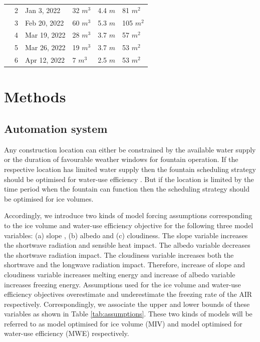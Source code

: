 \documentclass[tc, manuscript]{copernicus}
\begin{document}
\begin{table}
\begin{tabular}{@{}|llllll|@{}}
		\multicolumn{1}{|l|}{} & 2            & Jan 3, 2022   & 32 $m^{3}$      & 4.4 $m$
		                       & 81 $m^{2}$                                                                       \\
		\multicolumn{1}{|l|}{} & 3            & Feb 20, 2022   & 60 $m^{3}$      & 5.3 $m$
		                       & 105 $m^{2}$                                                                       \\
		\multicolumn{1}{|l|}{} & 4            & Mar 19, 2022   & 28 $m^{3}$      & 3.7 $m$
		                       & 57 $m^{2}$                                                                       \\
		\multicolumn{1}{|l|}{} & 5            & Mar 26, 2022   & 19 $m^{3}$      & 3.7 $m$
		                       & 53 $m^{2}$                                                                       \\
		\multicolumn{1}{|l|}{} & 6            & Apr 12, 2022   & 7 $m^{3}$      & 2.5 $m$
		                       & 53 $m^{2}$                                                                       \\
		\bottomrule
	\end{tabular}

\end{table}

\section{Methods}

\subsection{Automation system}

Any construction location can either be constrained by the available water supply or the duration of favourable
weather windows for fountain operation. If the respective location has limited water supply then the fountain
scheduling strategy should be optimised for water-use efficiency . But if the location is limited by the time
period when the fountain can function then the scheduling strategy should be optimised for ice volumes.

Accordingly, we introduce two kinds of model forcing assumptions corresponding to the ice volume and water-use
efficiency objective for the following three model variables: (a) slope , (b) albedo and (c) cloudiness.   The
slope variable increases the shortwave radiation and sensible heat impact. The albedo variable decreases the
shortwave radiation impact. The cloudiness variable increases both the shortwave and the longwave radiation
impact. Therefore, increase of slope and cloudiness variable increases melting energy and increase of albedo
variable increases freezing energy. Assumptions used for the ice volume and water-use efficiency objectives
overestimate and underestimate the freezing rate of the AIR respectively. Correspondingly, we associate the
upper and lower bounds of these variables as shown in Table \ref{tab:assumptions}. These two kinds of models
will be referred to as model optimised for ice volume (MIV) and model optimised for water-use efficiency (MWE)
respectively. 
\end{document}
